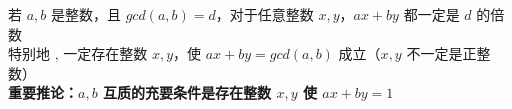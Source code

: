 \documentclass[E:/GsjzTle/main/main.tex]{subfiles}
\begin{document}
若 \(a,b\) 是整数，且 \(gcd(a,b)=d\)，对于任意整数 \(x,y\)，\(ax+by\)
都一定是 \(d\) 的倍数\\
特别地 , 一定存在整数 \(x,y\)，使 \(ax+by=gcd(a,b)\) 成立（\(x,y\)
不一定是正整数） \\
\textbf{重要推论：\(a,b\) 互质的充要条件是存在整数 \(x,y\) 使
\(ax+by=1\)}
\end{document}
